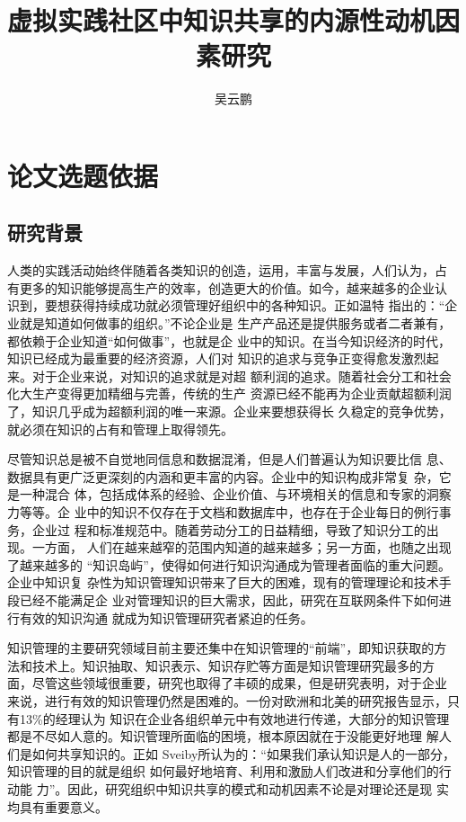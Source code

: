 \documentclass[12pt,a4paper]{ctexart}
\begin{document}
  \title{虚拟实践社区中知识共享的内源性动机因
      素研究 }
  \author {吴云鹏}
   \maketitle
 \newpage
  \tableofcontents



\newpage
  \section{论文选题依据}

  \subsection{研究背景}
人类的实践活动始终伴随着各类知识的创造，运用，丰富与发展，人们认为，占
有更多的知识能够提高生产的效率，创造更大的价值。如今，越来越多的企业认
识到，要想获得持续成功就必须管理好组织中的各种知识。正如温特
\cite{Williamson1994}指出的：“企业就是知道如何做事的组织。”不论企业是
生产产品还是提供服务或者二者兼有，都依赖于企业知道“如何做事”，也就是企
业中的知识。在当今知识经济的时代，知识已经成为最重要的经济资源，人们对
知识的追求与竞争正变得愈发激烈起来。对于企业来说，对知识的追求就是对超
额利润的追求。随着社会分工和社会化大生产变得更加精细与完善，传统的生产
资源已经不能再为企业贡献超额利润了，知识几乎成为超额利润的唯一来源。企业来要想获得长
久稳定的竞争优势，就必须在知识的占有和管理上取得领先。

尽管知识总是被不自觉地同信息和数据混淆，但是人们普遍认为知识要比信
息、数据具有更广泛更深刻的内涵和更丰富的内容。企业中的知识构成非常复
杂，它是一种混合
体，包括成体系的经验、企业价值、与环境相关的信息和专家的洞察力等等。企
业中的知识不仅存在于文档和数据库中，也存在于企业每日的例行事务，企业过
程和标准规范中。随着劳动分工的日益精细，导致了知识分工的出现。一方面，
人们在越来越窄的范围内知道的越来越多；另一方面，也随之出现了越来越多的
“知识岛屿”，使得如何进行知识沟通成为管理者面临的重大问题。企业中知识复
杂性为知识管理知识带来了巨大的困难，现有的管理理论和技术手段已经不能满足企
业对管理知识的巨大需求，因此，研究在互联网条件下如何进行有效的知识沟通
就成为知识管理研究者紧迫的任务。

知识管理的主要研究领域目前主要还集中在知识管理的“前端”，即知识获取的方
法和技术上。知识抽取、知识表示、知识存贮等方面是知识管理研究最多的方
面，尽管这些领域很重要，研究也取得了丰硕的成果，但是研究表明，对于企业
来说，进行有效的知识管理仍然是困难的。一份对欧洲和北美的研究报告显示，只有13\%的经理认为
知识在企业各组织单元中有效地进行传递，大部分的知识管理都是不尽如人意的\cite{Ruggles1998}。知识管理所面临的困境，根本原因就在于没能更好地理
解人们是如何共享知识的。正如
Sveiby所认为的：“如果我们承认知识是人的一部分，知识管理的目的就是组织
如何最好地培育、利用和激励人们改进和分享他们的行动能
力”\cite{Seviby1997}。因此，研究组织中知识共享的模式和动机因素不论是对理论还是现
实均具有重要意义。
\end{document}
